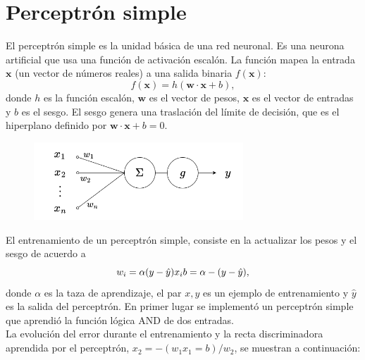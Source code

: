 \documentclass[12pt,a4paper]{article}
\begin{document}
\section{Perceptrón simple}
El perceptrón simple es la unidad básica de una red neuronal. Es una neurona artificial que usa una función de activación escalón. La función mapea la entrada $\mathbf{x}$ (un vector de números reales) a una salida binaria $f(\mathbf{x})$:
$$
f(\mathbf{x}) = h (\mathbf{w} \cdot \mathbf{x} + b),
$$
donde $h$ es la función escalón, $\mathbf{w}$ es el vector de pesos, $\mathbf{x}$ es el vector de entradas y $b$ es el sesgo. El sesgo genera una traslación del límite de decisión, que es el hiperplano definido por $\mathbf{w} \cdot \mathbf{x} + b = 0$.
\begin{figure}[H]
    \includegraphics[width=0.7\textwidth]{img/simple_perceptron.png}
    \centering
\end{figure}
El entrenamiento de un perceptrón simple, consiste en la actualizar los pesos y el sesgo de acuerdo a
$$
w_i = \alpha (y - \hat{y}) x_i\\
b = \alpha -(y - \hat{y}),
$$
donde $\alpha$ es la taza de aprendizaje, el par $x, y$ es un ejemplo de entrenamiento y $\hat{y}$ es la salida del perceptrón.
En primer lugar se implementó un perceptrón simple que aprendió la función lógica AND de dos entradas.\\
La evolución del error durante el entrenamiento y la recta discriminadora aprendida por el perceptrón, $x_2 = -(w_1 x_1 = b) / w_2$, se muestran a continuación:
\end{document}
